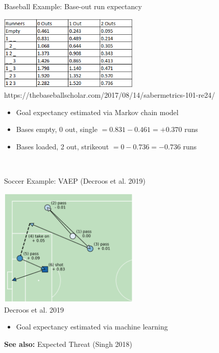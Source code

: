 \documentclass{beamer}
\begin{document}
\begin{frame}{Baseball Example: Base-out run expectancy}
  \begin{center}
    \includegraphics[width = 0.5\textwidth]{images/base_out_run_expectancy.png}
    \scriptsize\color{gray} https://thebaseballscholar.com/2017/08/14/sabermetrics-101-re24/
  \end{center}
  \begin{itemize}
    \item Goal expectancy estimated via Markov chain model
    \item Bases empty, 0 out, single $= 0.831 - 0.461 = +0.370$ runs
    \item Bases loaded, 2 out, strikeout $= 0 - 0.736 = -0.736$ runs
  \end{itemize}
  ~\\
\end{frame}


\begin{frame}{Soccer Example: VAEP (Decroos et al. 2019)}
  \begin{center}
    \includegraphics[width = 0.5\textwidth]{images/vaep.png}\\
    {\scriptsize\color{gray} Decroos et al. 2019}
    \begin{itemize}
      \item Goal expectancy estimated via machine learning
    \end{itemize}
  \end{center}
  {\bf See also:} Expected Threat (Singh 2018)
\end{frame}
\end{document}

